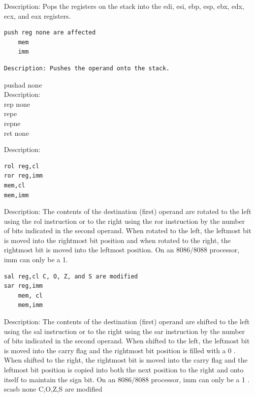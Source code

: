 \documentclass[10pt]{book}
\begin{document}
\begin{center}
\begin{center}
\begin{center}
\begin{center}
\begin{center}
Description: Pops the registers on the stack into the edi, esi, ebp, esp, ebx, edx, ecx, and eax registers.

\begin{verbatim}
push reg none are affected
    mem
    imm
\end{verbatim}

\begin{verbatim}
Description: Pushes the operand onto the stack.
\end{verbatim}

pushad none\\
Description:\\
rep none\\
repe\\
repne\\
ret none

Description:

\begin{verbatim}
rol reg,cl
ror reg,imm
mem,cl
mem,imm
\end{verbatim}

Description: The contents of the destination (first) operand are rotated to the left using the rol instruction or to the right using the ror instruction by the number of bits indicated in the second operand. When rotated to the left, the leftmost bit is moved into the rightmost bit position and when rotated to the right, the rightmost bit is moved into the leftmost position. On an $8086 / 8088$ processor, imm can only be a 1.

\begin{verbatim}
sal reg,cl C, O, Z, and S are modified
sar reg,imm
    mem, cl
    mem,imm
\end{verbatim}

Description: The contents of the destination (first) operand are shifted to the left using the sal instruction or to the right using the sar instruction by the number of bits indicated in the second operand. When shifted to the left, the leftmost bit is moved into the carry flag and the rightmost bit position is filled with a 0 . When shifted to the right, the rightmost bit is moved into the carry flag and the leftmost bit position is copied into both the next position to the right and onto itself to maintain the sign bit. On an $8086 / 8088$ processor, imm can only be a 1 .\\
scasb none C,O,Z,S are modified


\end{center}
\end{center}
\end{center}
\end{center}
\end{center}
\end{document}
